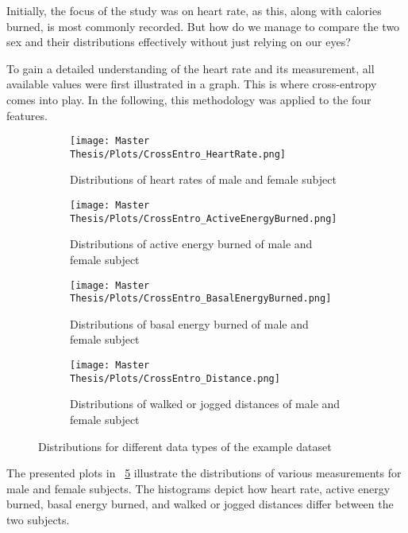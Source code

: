 Initially, the focus of the study was on heart rate, as this, along with calories burned, is most commonly recorded.
But how do we manage to compare the two sex and their distributions effectively without just relying on our eyes? 

To gain a detailed understanding of the heart rate and its measurement, all available values were first illustrated in a graph.
This is where cross-entropy comes into play. In the following, this methodology was applied to the four features.

\FloatBarrier
\begin{figure}[h!]
  \centering
  \begin{subfigure}{.55\textwidth}
    \centering
    \texttt{[image: Master Thesis/Plots/CrossEntro\_HeartRate.png]}
    \caption{Distributions of heart rates of male and female subject}
    \label{fig:heart_rate}
  \end{subfigure}%
  \begin{subfigure}{.55\textwidth}
    \centering
    \texttt{[image: Master Thesis/Plots/CrossEntro\_ActiveEnergyBurned.png]}
    \caption{Distributions of active energy burned of male and female subject}
    \label{fig:active_energy}
  \end{subfigure}
  \newline
  \begin{subfigure}{.55\textwidth}
    \centering
    \texttt{[image: Master Thesis/Plots/CrossEntro\_BasalEnergyBurned.png]}
    \caption{Distributions of basal energy burned of male and female subject}
    \label{fig:basal_energy}
  \end{subfigure}%
  \begin{subfigure}{.55\textwidth}
    \centering
    \texttt{[image: Master Thesis/Plots/CrossEntro\_Distance.png]}
    \caption{Distributions of walked or jogged distances of male and female subject}
    \label{fig:distance}
  \end{subfigure}
  \caption{Distributions for different data types of the example dataset}
  \label{fig:cross_entropy}
\end{figure}
\FloatBarrier

The presented plots in ~\ref{fig:cross_entropy} illustrate the distributions of various measurements for male and female subjects. The histograms depict how heart rate, active energy burned, basal energy burned, and walked or jogged distances differ between the two subjects.

